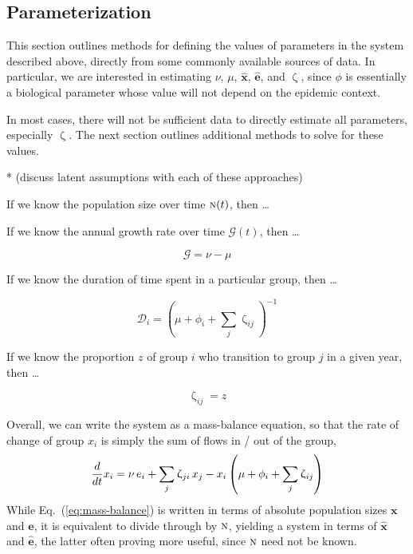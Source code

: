 \documentclass{article}
\numberwithin{equation}{section}
\newcommand{\eq}[1]{Eq.~(\ref{#1})}
\renewcommand{\zeta}{\upzeta}
\newcommand{\x}{\hat{x}}
\newcommand{\e}{\hat{e}}
\newcommand{\N}{\textsc{n}}
\begin{document}
\subsection{Parameterization}
This section outlines methods for defining the values of parameters
in the system described above,
directly from some commonly available sources of data.
In particular, we are interested in estimating $\nu$, $\mu$, $\bm{\x}$, $\bm{\e}$, and $\zeta$,
since $\phi$ is essentially a biological parameter
whose value will not depend on the epidemic context.
\par
In most cases, there will not be sufficient data to directly estimate all parameters,
especially $\zeta$.
The next section outlines additional methods to solve for these values.
\par
* (discuss latent assumptions with each of these approaches)

If we know the population size over time $\N(t)$, then \dots

If we know the annual growth rate over time $\mathcal{G}(t)$, then \dots

\begin{equation}\label{eq:pop-growth}
  \mathcal{G} = \nu - \mu
\end{equation}

If we know the duration of time spent in a particular group, then \dots

\begin{equation}\label{eq:duration}
  \mathcal{D}_i = {\left(\mu + \phi_i + \sum_{j}{\zeta_{ij}}\right)}^{-1}
\end{equation}

If we know the proportion $z$ of group $i$ who transition to group $j$ in a given year, then \dots

\begin{equation}
\zeta_{ij} = z
\end{equation}

Overall, we can write the system as a mass-balance equation,
so that the rate of change of group $x_i$
is simply the sum of flows in / out of the group,
\begin{equation}\label{eq:mass-balance}
  \frac{d}{dt}x_i
  = \nu \thinspace e_i + \sum_{j}{\zeta_{ji} \thinspace x_j}
  - x_i \left( \mu + \phi_i + \sum_{j}{\zeta_{ij}} \right)
\end{equation}
While \eq{eq:mass-balance} is written in terms of absolute population sizes $\bm{x}$ and $\bm{e}$,
it is equivalent to divide through by $\N$, yielding a system in terms of $\bm{\x}$ and $\bm{\e}$,
the latter often proving more useful, since $\N$ need not be known.
\end{document}
